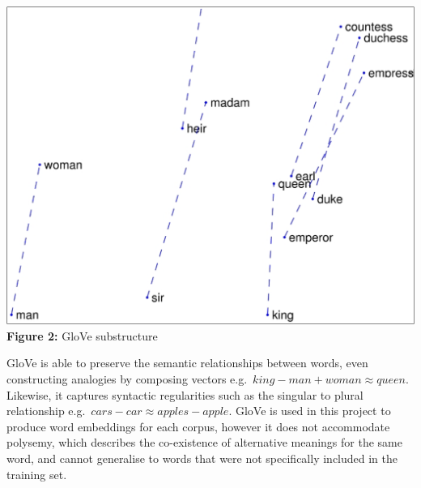 \documentclass[12pt,a4paper]{article}
\begin{document}
\begin{minipage}{0.3\textwidth}
	\vspace{-10pt}
	\begin{center}
		\hspace{-1cm}\includegraphics[width=1.05\textwidth]{Images/outside1.png}\\
		\hspace{-1cm}\textbf{Figure 2:} GloVe substructure\footnotemark[6]\\
		\label{Glove Model}
	\end{center}
\end{minipage} \hfill
\begin{minipage}{0.66\textwidth}
	 GloVe is able to preserve the semantic relationships between words, even constructing analogies by composing vectors e.g.\ $king - man + woman ≈ queen$. Likewise, it captures syntactic regularities such as the singular to plural relationship e.g.\ $cars - car ≈ apples - apple$. GloVe is used in this project to produce word embeddings for each corpus, however it does not accommodate polysemy, which describes the co-existence of alternative meanings for the same word, and cannot generalise to words that were not specifically included in the training set.\\
\end{minipage}\\
\end{document}
